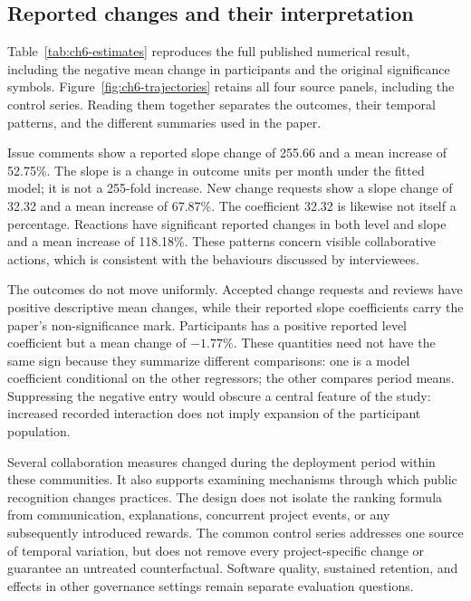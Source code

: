 \subsection{Reported changes and their interpretation}
Table~\ref{tab:ch6-estimates} reproduces the full published numerical result, including the negative mean change in participants and the original significance symbols. Figure~\ref{fig:ch6-trajectories} retains all four source panels, including the control series. Reading them together separates the outcomes, their temporal patterns, and the different summaries used in the paper.




Issue comments show a reported slope change of 255.66 and a mean increase of 52.75\%. The slope is a change in outcome units per month under the fitted model; it is not a 255-fold increase. New change requests show a slope change of 32.32 and a mean increase of 67.87\%. The coefficient 32.32 is likewise not itself a percentage. Reactions have significant reported changes in both level and slope and a mean increase of 118.18\%. These patterns concern visible collaborative actions, which is consistent with the behaviours discussed by interviewees.

The outcomes do not move uniformly. Accepted change requests and reviews have positive descriptive mean changes, while their reported slope coefficients carry the paper's non-significance mark. Participants has a positive reported level coefficient but a mean change of \(-1.77\%\). These quantities need not have the same sign because they summarize different comparisons: one is a model coefficient conditional on the other regressors; the other compares period means. Suppressing the negative entry would obscure a central feature of the study: increased recorded interaction does not imply expansion of the participant population.

Several collaboration measures changed during the deployment period within these communities. It also supports examining mechanisms through which public recognition changes practices. The design does not isolate the ranking formula from communication, explanations, concurrent project events, or any subsequently introduced rewards. The common control series addresses one source of temporal variation, but does not remove every project-specific change or guarantee an untreated counterfactual. Software quality, sustained retention, and effects in other governance settings remain separate evaluation questions.

